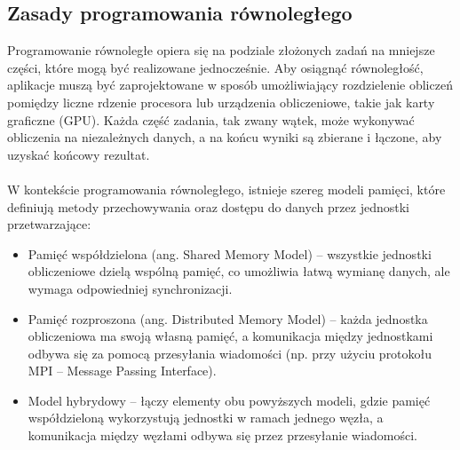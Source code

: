 \subsection{Zasady programowania równoległego}
Programowanie równoległe opiera się na podziale złożonych zadań na mniejsze części, które mogą być realizowane jednocześnie. Aby osiągnąć równoległość, aplikacje muszą być zaprojektowane w sposób umożliwiający rozdzielenie obliczeń pomiędzy liczne rdzenie procesora lub urządzenia obliczeniowe, takie jak karty graficzne (GPU). Każda część zadania, tak zwany wątek, może wykonywać obliczenia na niezależnych danych, a na końcu wyniki są zbierane i łączone, aby uzyskać końcowy rezultat.
\\\\
W kontekście programowania równoległego, istnieje szereg modeli pamięci, które definiują metody przechowywania oraz dostępu do danych przez jednostki przetwarzające:
\begin{itemize}
    \item Pamięć współdzielona (ang. Shared Memory Model) – wszystkie jednostki obliczeniowe dzielą wspólną pamięć, co umożliwia łatwą wymianę danych, ale wymaga odpowiedniej synchronizacji.
    \item Pamięć rozproszona (ang. Distributed Memory Model) – każda jednostka obliczeniowa ma swoją własną pamięć, a komunikacja między jednostkami odbywa się za pomocą przesyłania wiadomości (np. przy użyciu protokołu MPI – Message Passing Interface).
    \item Model hybrydowy – łączy elementy obu powyższych modeli, gdzie pamięć współdzieloną wykorzystują jednostki w ramach jednego węzła, a komunikacja między węzłami odbywa się przez przesyłanie wiadomości.
\end{itemize}

